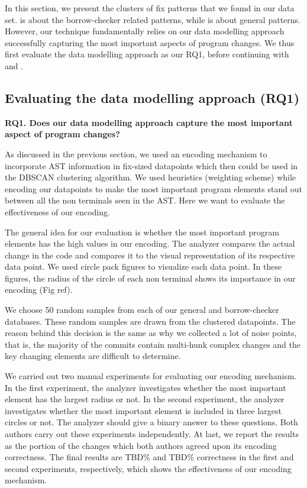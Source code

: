 In this section, we present the clusters of fix patterns that we found in our data set. \RQBC{} is about the borrow-checker related patterns, while \RQG{} is about general patterns. However, our technique fundamentally relies on our data modelling approach successfully capturing the most important aspects of program changes. We thus first evaluate the data modelling approach as our RQ1, before continuing with \RQBC{} and \RQG{}.

\subsection{Evaluating the data modelling approach (RQ1)}

\textbf{RQ1. Does our data modelling approach capture the most important aspect of program changes?} 

As discussed in the previous section, we used an encoding mechanism to incorporate AST information in fix-sized datapoints which then could be used in the DBSCAN clustering algorithm. We used heuristics (weighting scheme) while encoding our datapoints to make the most important program elements stand out between all the non terminals seen in the AST. Here we want to evaluate the effectiveness of our encoding.

The general idea for our evaluation is whether the most important program elements has the high values in our encoding. The analyzer compares the actual change in the code and compares it to the visual representation of its respective data point. We used circle pack figures to visualize each data point. In these figures, the radius of the circle of each non terminal shows its importance in our encoding (Fig ref).

We choose 50 random samples from each of our general and borrow-checker databases. These random samples are drawn from the clustered datapoints. The reason behind this decision is the same as why we collected a lot of noise points, that is, the majority of the commits contain multi-hunk complex changes and the key changing elements are difficult to determine.

We carried out two manual experiments for evaluating our encoding mechanism. In the first experiment, the analyzer investigates whether the most important element has the largest radius or not. In the second experiment, the analyzer investigates whether the most important element is included in three largest circles or not. The analyzer should give a binary answer to these questions. Both authors carry out these experiments independently. At last, we report the results as the portion of the changes which both authors agreed upon its encoding correctness. The final results are TBD\% and TBD\% correctness in the first and second experiments, respectively, which shows the effectiveness of our encoding mechanism.

